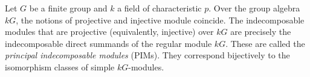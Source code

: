Let $G$ be a finite group and $k$ a field of characteristic $p$. Over the group algebra $kG$, the notions of projective and injective module coincide. The indecomposable modules that are projective (equivalently, injective) over $kG$ are precisely the indecomposable direct summands of the regular module $kG$. These are called the {\it principal indecomposable modules} (PIMs). They correspond bijectively to the isomorphism classes of simple $kG$-modules.
